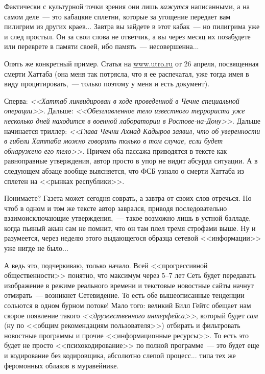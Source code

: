 \documentclass{scrbook}
\newcommand{\flqq}{<<}
\newcommand{\frqq}{>>}
\newcommand{\mdash}{~--- }
\newcommand{\ndash}{--}
\newcommand{\commamdash}{~--- } %
\begin{document}
Фактически с культурной точки зрения они лишь \emph{кажутся} написанными, а на самом деле{\mdash}это кабацкие сплетни, которые за угощение передает вам пилигрим из других краев... Завтра вы зайдете в этот кабак{\mdash}но пилигрима уже и след простыл. Он за свои слова не ответчик, а вы через месяц их позабудете или переврете в памяти своей, ибо память{\mdash}несовершенна...

Опять же конкретный пример. Статья на \url{www.utro.ru} от 26 апреля, посвященная смерти Хаттаба (она меня так потрясла, что я ее распечатал, уже тогда имея в виду процитировать,{\commamdash}только поэтому у меня и есть документ).

Сперва: \emph{{\flqq}Хаттаб ликвидирован в ходе проведенной в Чечне специальной операции{\frqq}}. Дальше: \emph{{\flqq}Обезглавленное тело известного террориста уже несколько дней находится в военной лаборатории в Ростове-на-Дону{\frqq}}. Дальше начинается триллер: \emph{{\flqq}Глава Чечни Ахмад Кадыров заявил, что об уверенности в гибели Хаттаба можно говорить только в том случае, если будет обнаружено его тело{\frqq}}. Причем оба пассажа приводятся в тексте как равноправные утверждения, автор просто в упор не видит абсурда ситуации. А в следующем абзаце вообще выясняется, что ФСБ узнало о смерти Хаттаба из сплетен на {\flqq}рынках республики{\frqq}.

Понимаете? Газета может сегодня соврать, а завтра от своих слов отречься. Но чтоб в одном и том же тексте автор заврался, приводя последовательно взаимоисключающие утверждения,{\commamdash}такое возможно лишь в устной балладе, когда пьяный акын сам не помнит, что он там плел тремя строфами выше. Ну и разумеется, через неделю этого выдающегося образца сетевой {\flqq}информации{\frqq} уже нигде не было...

А ведь это, подчеркиваю, только начало. Всей {\flqq}прогрессивной общественности{\frqq} понятно, что максимум через 5{\ndash}7 лет Сеть будет передавать изображение в режиме реального времени и текстовые новостные сайты начнут отмирать{\mdash}возникнет Сетевидение. То есть обе вышеописанные тенденции сольются в одном бурном потоке! Мало того: великий Билл Гейтс обещает нам скорое появление такого \emph{{\flqq}дружественного интерфейса{\frqq}}, который будет \emph{сам} (ну по {\flqq}общим рекомендациям пользователя{\frqq}) отбирать и фильтровать новостные программы и прочие {\flqq}информационные ресурсы{\frqq}. То есть это будет не просто {\flqq}психокодирование{\frqq} по полной программе{\mdash}это будет еще и кодирование без кодировщика, абсолютно слепой процесс... типа тех же феромонных облаков в муравейнике.
\end{document}
